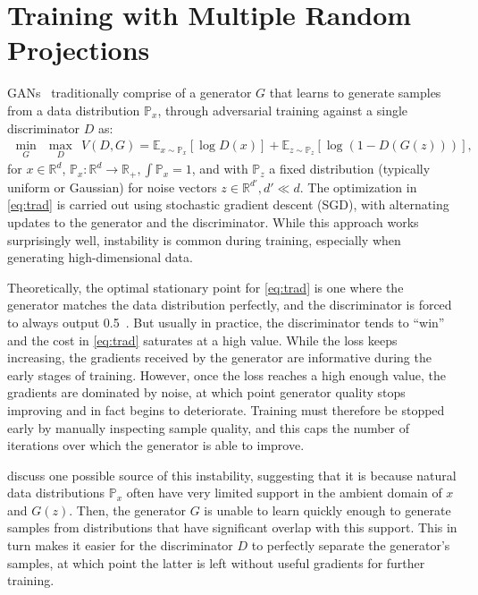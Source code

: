 \documentclass{article}
\newcommand{\R}{\mathbb{R}}
\newcommand{\pz}{\mathbb{P}_{z}}
\newcommand{\px}{\mathbb{P}_{x}}
\newcommand{\expec}{\mathbb{E}}
\begin{document}
\section{Training  with Multiple Random Projections}
\label{sec:method}

GANs~\citep{goodfellow2014generative} traditionally comprise of a  generator $G$ that learns to generate samples from a data distribution $\px$, through adversarial training against a single discriminator $D$ as:
\begin{align}
  \label{eq:trad}
\underset{G}{\min} ~~  \underset{  D }{\max} ~~  V(D, G) =  \expec_{x \sim \px} [\log D(x)] + \expec_{z \sim \pz} [\log(1- D(G(z)))],
\end{align}
for $x\in\R^d$, $\px: \R^d\rightarrow\R_+, \int \px = 1$, and with $\pz$ a fixed distribution (typically uniform or Gaussian) for noise vectors $z\in\R^{d'}, d' \ll d$. The optimization in \eqref{eq:trad} is carried out using stochastic gradient descent (SGD), with alternating updates to the generator and the discriminator.  While this approach works surprisingly well, instability is common during training, especially when generating high-dimensional data.

Theoretically, the optimal stationary point for \eqref{eq:trad} is one where the generator matches the data distribution perfectly, and the discriminator is forced to always output 0.5~\citep{goodfellow2014generative}. But usually in practice, the discriminator tends to ``win'' and the cost in \eqref{eq:trad} saturates at a high value. While the loss keeps increasing, the gradients received by the  generator are informative during the early stages of training. However, once the loss reaches a high enough value, the gradients are dominated by noise, at which point generator quality stops improving and in fact begins to deteriorate. Training must therefore be stopped early by manually inspecting sample quality, and this caps the number of iterations over which the generator is able to improve.

\citet{arjovsky2017towards} discuss one possible source of this instability, suggesting that it is because natural data distributions $\px$ often have very limited support in the ambient domain of $x$ and $G(z)$. Then, the generator $G$ is unable to learn quickly enough to generate samples from distributions that have significant overlap with this support. This in turn makes it easier for the discriminator $D$ to perfectly separate the generator's samples, at which point the latter is left without useful gradients for further training.
\end{document}
